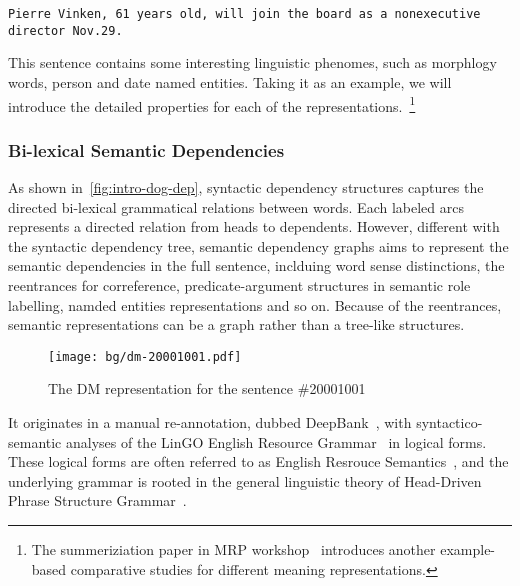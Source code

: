 \texttt{Pierre Vinken, 61 years old, will join the board as a nonexecutive director Nov.29.}

This sentence contains some interesting linguistic phenomes, such as
morphlogy words, person and date named entities. Taking it as an
example, we will introduce the detailed properties for each of the
representations.~\footnote{The summeriziation paper in MRP
  workshop~\citep{Mar:San:Mar:93} introduces another example-based
  comparative studies for different meaning representations.}

\subsubsection{Bi-lexical Semantic Dependencies}
\label{ssec:bg:bi-leixcal}

As shown in~\autoref{fig:intro-dog-dep}, syntactic dependency
structures captures the directed bi-lexical grammatical relations
between words. Each labeled arcs represents a directed relation from
heads to dependents. However, different with the syntactic dependency
tree, semantic dependency graphs aims to represent the semantic
dependencies in the full sentence, inclduing word sense distinctions,
the reentrances for correference, predicate-argument structures in
semantic role labelling, namded entities representations and so
on. Because of the reentrances, semantic representations can be a
graph rather than a tree-like structures.
\begin{figure}[!th]
\centering
\texttt{[image: bg/dm-20001001.pdf]}
\caption{\label{fig:bg-dm}The DM representation for the sentence
  \#20001001}
\end{figure}

 It
originates in a manual re-annotation, dubbed
DeepBank~\citep{Fli:Kor:Zha:12}, with syntactico-semantic analyses of
the LinGO English Resource Grammar~\citep{Oep:Fli:Tou:04} in logical
forms. These logical forms are often referred to as English Resrouce
Semantics~\citep[ERS,][]{Ben:Fli:Oep:15}, and the underlying grammar
is rooted in the general linguistic theory of Head-Driven Phrase
Structure Grammar~\citep[HPSG,][]{Pol:Sag:94}.

